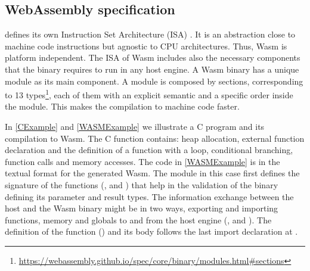 %







\subsection{WebAssembly specification}

\wasm defines its own Instruction Set Architecture (ISA) \cite{wasm_spec}. It is an abstraction close to machine code instructions but agnostic to CPU architectures. Thus, Wasm  is platform independent. The ISA of Wasm  includes also the necessary components that the binary requires to run in any host engine. 
A Wasm  binary has a unique module as its main component. A module is composed by sections, corresponding to 13 types\footnote{\url{https://webassembly.github.io/spec/core/binary/modules.html\#sections}}, each of them with an explicit semantic and a specific order inside the module. This makes the compilation to machine code faster. %


In \autoref{CExample} and \autoref{WASMExample} we illustrate a C program and its compilation to Wasm. The C function contains: heap allocation, external function declaration and the definition of a function with a loop, conditional branching, function calls and memory accesses. The code in \autoref{WASMExample} is in the textual format for the generated Wasm. The module in this case first defines the signature of the functions (,   and  )  that help in the validation of the binary defining its parameter and result types. The information exchange between the host and the Wasm  binary might be in two ways, exporting and importing functions, memory and globals to and from the host engine (,  and ). The definition of the function () and its body follows the last import declaration at . 

